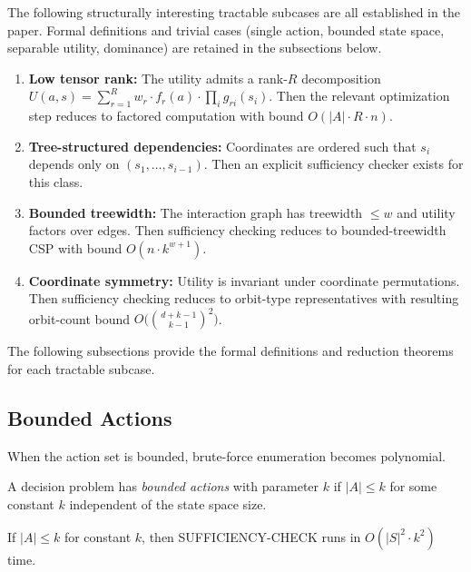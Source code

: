 \begin{theorem}\label{thm:tractable}
The following structurally interesting tractable subcases are all established in the paper. Formal definitions and trivial cases (single action, bounded state space, separable utility, dominance) are retained in the subsections below.
\begin{enumerate}
\item \textbf{Low tensor rank:} The utility admits a rank-$R$ decomposition $U(a,s) = \sum_{r=1}^R w_r \cdot f_r(a) \cdot \prod_i g_{ri}(s_i)$. Then the relevant optimization step reduces to factored computation with bound $O(|A| \cdot R \cdot n)$. 
\item \textbf{Tree-structured dependencies:} Coordinates are ordered such that $s_i$ depends only on $(s_1,\ldots, s_{i-1})$. Then an explicit sufficiency checker exists for this class. 
\item \textbf{Bounded treewidth:} The interaction graph has treewidth $\le w$ and utility factors over edges. Then sufficiency checking reduces to bounded-treewidth CSP with bound $O(n \cdot k^{w+1})$. 
\item \textbf{Coordinate symmetry:} Utility is invariant under coordinate permutations. Then sufficiency checking reduces to orbit-type representatives with resulting orbit-count bound $O\bigl(\binom{d+k-1}{k-1}^2\bigr)$. 
\end{enumerate}
\end{theorem}

The following subsections provide the formal definitions and reduction theorems for each tractable subcase.

\subsection{Bounded Actions}\label{sec:tract-bounded}

When the action set is bounded, brute-force enumeration becomes polynomial.

\begin{definition}
A decision problem has \emph{bounded actions} with parameter $k$ if $|A| \leq k$ for some constant $k$ independent of the state space size.
\end{definition}

\begin{theorem}\label{thm:bounded-actions}
If $|A| \leq k$ for constant $k$, then SUFFICIENCY-CHECK runs in $O(|S|^2 \cdot k^2)$ time.
\end{theorem}


